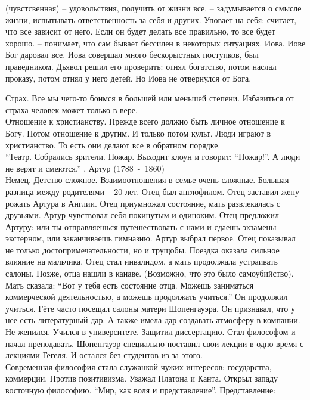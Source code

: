 \documentclass[a4paper,12pt]{report} %
\begin{document}
\begin{itemize}
\begin{enumerate}
 (чувстсвенная) -- удовольствия, получить от жизни все.
 -- задумывается  о смысле жизни, испытывать
  ответственность за себя и других. Уповает на себя: считает, что все
  зависит от него. Если он будет делать все правильно, то все будет хорошо.
 -- понимает, что сам бывает бессилен в некоторых
  ситуациях. Иова. Иове Бог даровал все. Иова совершал много
  бескорыстных поступков, был праведником. Дьявол решил его проверить:
  отнял богатство, потом наслал проказу, потом отнял у него детей. Но
  Иова не отвернулся от Бога.
\end{enumerate}
Страх. Все мы чего-то боимся в большей или меньшей степени. Избавиться
от страха человек может только в вере.\\
Отношение к христианству. Прежде всего должно быть личное отношение к
Богу. Потом отношение к другим. И только потом культ. Люди играют в
христианство. То есть они делают все в обратном порядке.\\
``Театр. Собрались зрители. Пожар. Выходит клоун и говорит: ``Пожар!''. А
люди не верят и смеются.'' 
, Артур (1788~-~1860)\\
Немец. Детство сложное. Взаимоотношения в семье очень сложные. Большая
разница между родителями -- 20 лет. Отец был англофилом. Отец заставил
жену рожать Артура в Англии. Отец приумножал состояние, мать
развлекалась с друзьями. Артур чувствовал себя покинутым и
одиноким. Отец предложил Артуру: или ты отправляешься путешествовать с
нами и сдаешь экзамены экстерном, или заканчиваешь гимназию. Артур
выбрал первое. Отец показывал не только достопримечательности, но и
трущобы. Поездка оказала сильное влияние на мальчика. Отец стал
инвалидом, а мать продолжала устраивать салоны. Позже, отца
нашли в канаве. (Возможно, что это было самоубийство). Мать сказала: ``Вот у
тебя есть состояние отца. Можешь заниматься коммерческой
деятельностью, а можешь продолжать учиться.'' Он продолжил
учиться. Гёте часто посещал салоны матери Шопенгауэра. Он признавал,
что у нее есть литературный дар. А также имела дар создавать атмосферу
в компании. Не женился. Учился в университете. Защитил
диссертацию. Стал философом и начал преподавать. Шопенгауэр специально
поставил свои лекции в одно время с лекциями Гегеля. И остался без
студентов из-за этого.\\
Современная философия стала служанкой чужих интересов: государства,
коммерции. Против позитивизма. Уважал Платона и Канта. Открыл западу
восточную философию. ``Мир, как воля и представление''. Представление:

\end{itemize}
\end{document}
